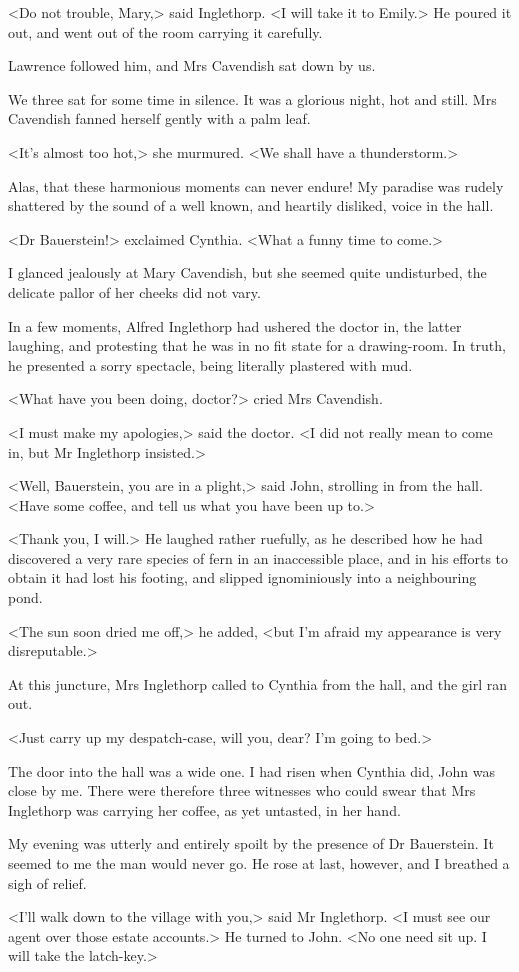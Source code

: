  <Do not trouble, Mary,> said Inglethorp. <I will take it to Emily.> He poured it out, and went out of the room carrying it carefully. 

 Lawrence followed him, and Mrs Cavendish sat down by us. 

 We three sat for some time in silence. It was a glorious night, hot and still. Mrs Cavendish fanned herself gently with a palm leaf. 

 <It's almost too hot,> she murmured. <We shall have a thunderstorm.> 

 Alas, that these harmonious moments can never endure! My paradise was rudely shattered by the sound of a well known, and heartily disliked, voice in the hall. 

 <Dr Bauerstein!> exclaimed Cynthia. <What a funny time to come.> 

 I glanced jealously at Mary Cavendish, but she seemed quite undisturbed, the delicate pallor of her cheeks did not vary. 

 In a few moments, Alfred Inglethorp had ushered the doctor in, the latter laughing, and protesting that he was in no fit state for a drawing-room. In truth, he presented a sorry spectacle, being literally plastered with mud. 

 <What have you been doing, doctor?> cried Mrs Cavendish. 

 <I must make my apologies,> said the doctor. <I did not really mean to come in, but Mr Inglethorp insisted.> 

 <Well, Bauerstein, you are in a plight,> said John, strolling in from the hall. <Have some coffee, and tell us what you have been up to.> 

 <Thank you, I will.> He laughed rather ruefully, as he described how he had discovered a very rare species of fern in an inaccessible place, and in his efforts to obtain it had lost his footing, and slipped ignominiously into a neighbouring pond. 

 <The sun soon dried me off,> he added, <but I'm afraid my appearance is very disreputable.> 

 At this juncture, Mrs Inglethorp called to Cynthia from the hall, and the girl ran out. 

 <Just carry up my despatch-case, will you, dear? I'm going to bed.> 

 The door into the hall was a wide one. I had risen when Cynthia did, John was close by me. There were therefore three witnesses who could swear that Mrs Inglethorp was carrying her coffee, as yet untasted, in her hand. 

 My evening was utterly and entirely spoilt by the presence of Dr Bauerstein. It seemed to me the man would never go. He rose at last, however, and I breathed a sigh of relief. 

 <I'll walk down to the village with you,> said Mr Inglethorp. <I must see our agent over those estate accounts.> He turned to John. <No one need sit up. I will take the latch-key.> 